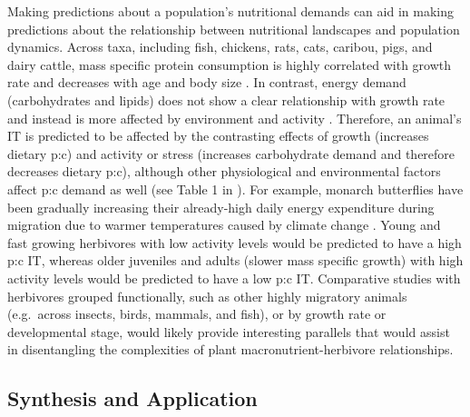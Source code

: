 \documentclass[
]{article}
\begin{document}
Making predictions about a population's nutritional demands can aid in
making predictions about the relationship between nutritional landscapes
and population dynamics. Across taxa, including fish, chickens, rats,
cats, caribou, pigs, and dairy cattle, mass specific protein consumption
is highly correlated with growth rate and decreases with age and body
size \citep{talal_body_2023}. In contrast, energy demand (carbohydrates
and lipids) does not show a clear relationship with growth rate and
instead is more affected by environment and activity
\citep{talal_body_2023}. Therefore, an animal's IT is predicted to be
affected by the contrasting effects of growth (increases dietary p:c)
and activity or stress (increases carbohydrate demand and therefore
decreases dietary p:c), although other physiological and environmental
factors affect p:c demand as well (see Table 1 in
\citet{cease_how_2024}). For example, monarch butterflies have been
gradually increasing their already-high daily energy expenditure during
migration due to warmer temperatures caused by climate change
\citep{parlin_cost_2023}. Young and fast growing herbivores with low
activity levels would be predicted to have a high p:c IT, whereas older
juveniles and adults (slower mass specific growth) with high activity
levels would be predicted to have a low p:c IT. Comparative studies with
herbivores grouped functionally, such as other highly migratory animals
(e.g.~across insects, birds, mammals, and fish), or by growth rate or
developmental stage, would likely provide interesting parallels that
would assist in disentangling the complexities of plant
macronutrient-herbivore relationships.

\subsection{Synthesis and Application}\label{synthesis-and-application}
\end{document}
